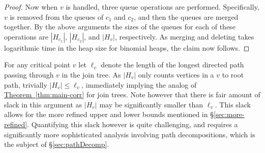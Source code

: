\documentclass[11pt]{article}
\theoremstyle{definition}
\newcommand{\Sec}[1]{\hyperref[sec:#1]{\S\ref*{sec:#1}}} %
\newcommand{\Thm}[1]{\hyperref[thm:#1]{Theorem~\ref*{thm:#1}}} %
\begin{document}
\begin{proof}
Now when $v$ is handled, three queue operations are performed.  Specifically, $v$ is removed from the queues of $c_1$ and $c_2$, and then the queues are 
merged together.  By the above arguments the sizes of the queues for each of these operations are $|H_{c_1}|$, $|H_{c_2}|$, and $|H_v|$, respectively.  
As merging and deleting takes logarithmic time in the heap size for binomial heaps, the claim now follows.
\end{proof}


For any critical point $v$ let $\ell_v$ denote the length of the longest directed path passing through $v$ in the join tree. 
As $|H_v|$ only counts vertices in a $v$ to root path, trivially $|H_v|\leq \ell_v$, immediately implying the analog of \Thm{main-corr} for join trees.
Note however that there is fair amount of slack in this argument as $|H_v|$ may be significantly smaller than $\ell_v$.  
This slack allows for the more refined upper and lower bounds mentioned in \Sec{more-refined}.  Quantifying this slack however is quite challenging, 
and requires a significantly more sophisticated analysis involving path decompositions, which is the subject of \Sec{pathDecomp}.



\end{document}

